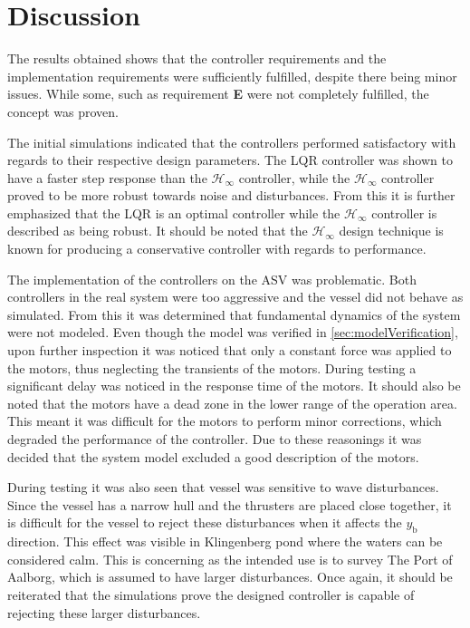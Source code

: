 \chapter{Discussion}\label{chap:discussion}

The results obtained shows that the controller requirements and the implementation requirements were sufficiently fulfilled, despite there being minor issues. While some, such as requirement \textbf{E} were not completely fulfilled, the concept was proven.

The initial simulations indicated that the controllers performed satisfactory with regards to their respective design parameters. The LQR controller was shown to have a faster step response than the $\mathcal{H}_\infty$ controller, while the $\mathcal{H}_\infty$ controller proved to be more robust towards noise and disturbances. From this it is further emphasized that the LQR is an optimal controller while the $\mathcal{H}_\infty$ controller is described as being robust. It should be noted that the $\mathcal{H}_\infty$ design technique is known for producing a conservative controller with regards to performance.

The implementation of the controllers on the ASV was problematic. Both controllers in the real system were too aggressive and the vessel did not behave as simulated. From this it was determined that fundamental dynamics of the system were not modeled. Even though the model was verified in \autoref{sec:modelVerification}, upon further inspection it was noticed that only a constant force was applied to the motors, thus neglecting the transients of the motors. During testing a significant delay was noticed in the response time of the motors. It should also be noted that the motors have a dead zone in the lower range of the operation area. This meant it was difficult for the motors to perform minor corrections, which degraded the performance of the controller. Due to these reasonings it was decided that the system model excluded a good description of the motors. 

During testing it was also seen that vessel was sensitive to wave disturbances. Since the vessel has a narrow hull and the thrusters are placed close together, it is difficult for the vessel to reject these disturbances when it affects the $y_\mathrm{b}$ direction. This effect was visible in Klingenberg pond where the waters can be considered calm. This is concerning as the intended use is to survey The Port of Aalborg, which is assumed to have larger disturbances. Once again, it should be reiterated that the simulations prove the designed controller is capable of rejecting these larger disturbances.

